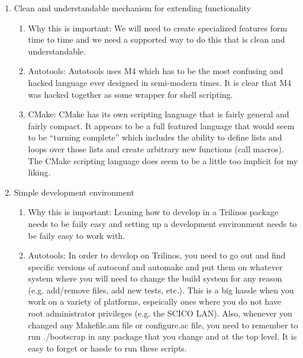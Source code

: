 \documentclass[pdf,ps2pdf,11pt]{SANDreport}
\begin{document}
\begin{enumerate}
\begin{enumerate}
  \end{enumerate}

{}\item Clean and understandable mechanism for extending
functionality

  \begin{enumerate}

  {}\item Why this is important: We will need to create specialized
  features form time to time and we need a supported way to do this
  that is clean and understandable.

  {}\item Autotools: Autotools uses M4 which has to be the most
  confusing and hacked language ever designed in semi-modern times.
  It is clear that M4 was hacked together as some wrapper for shell
  scripting.

  {}\item CMake: CMake has its own scripting language that is fairly
  general and fairly compact.  It appears to be a full featured
  language that would seem to be ``turning complete'' which includes
  the ability to define lists and loops over those lists and create
  arbitrary new functions (call macros).  The CMake scripting
  language does seem to be a little too implicit for my liking.

  \end{enumerate}

{}\item Simple development environment

  \begin{enumerate}

  {}\item Why this is important: Leaning how to develop in a Trilinos
  package needs to be faily easy and setting up a development
  environment needs to be faily easy to work with.

  {}\item Autotools: In order to develop on Trilinos, you need to go
  out and find specific versions of autoconf and automake and put them
  on whatever system where you will need to change the build system
  for any reason (e.g. add/remove files, add new tests, etc.).  This
  is a big hassle when you work on a variety of platforms, espeically
  ones where you do not have root administrator privileges (e.g. the
  SCICO LAN).  Also, whenever you changed any Makefile.am file or
  configure.ac file, you need to remember to run ./bootscrap in any
  package that you change and at the top level.  It is easy to forget
  or hassle to run these scripts.


\end{enumerate}
\end{enumerate}
\end{document}

